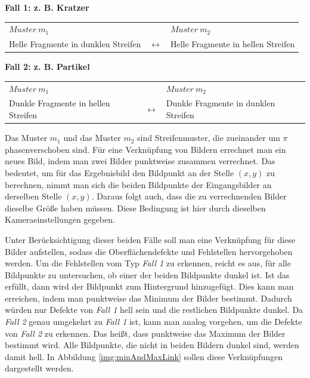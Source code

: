 \p
\textbf{Fall 1: z. B. Kratzer}
\nopagebreak
\par\medskip\noindent
\begin{tabular}{@{} p{} c p{} @{}}
$Muster ~m_1$ &  & $Muster ~m_2$ \\ 
	Helle Fragmente in dunklen Streifen & $ \longleftrightarrow $ & Helle Fragmente in hellen Streifen \\ 
\end{tabular}

\p
\textbf{Fall 2: z. B. Partikel}
\nopagebreak
\par\medskip\noindent
\begin{tabular}{@{} p{} c p{} @{}}
	$Muster ~m_1$ &  & $Muster ~m_2$ \\ 
	Dunkle Fragmente in hellen Streifen & $ \longleftrightarrow $ & Dunkle Fragmente in dunklen Streifen \\ 
\end{tabular}

\p
Das Muster $m_1$ und das Muster $m_2$ sind Streifenmuster, die zueinander um $ \pi $ phasenverschoben sind.
Für eine Verknüpfung von Bildern errechnet man ein neues Bild, indem man zwei Bilder punktweise zusammen verrechnet.
Das bedeutet, um für das Ergebnisbild den Bildpunkt an der Stelle $ (x,y) $ zu berechnen, nimmt man sich die beiden Bildpunkte der Eingangsbilder an derselben Stelle $ (x,y) $.
Daraus folgt auch, dass die zu verrechnenden Bilder dieselbe Größe haben müssen.
Diese Bedingung ist hier durch dieselben Kameraeinstellungen gegeben.


\p
Unter Berücksichtigung dieser beiden Fälle soll man eine Verknüpfung für diese Bilder aufstellen, sodass die Oberflächendefekte und Fehlstellen hervorgehoben werden.
Um die Fehlstellen vom Typ \textit{Fall 1} zu erkennen, reicht es aus, für alle Bildpunkte zu untersuchen, ob einer der beiden Bildpunkte dunkel ist.
Ist das erfüllt, dann wird der Bildpunkt zum Hintergrund hinzugefügt.
Dies kann man erreichen, indem man punktweise das Minimum der Bilder bestimmt.
Dadurch würden nur Defekte von \textit{Fall 1} hell sein und die restlichen Bildpunkte dunkel.
Da \textit{Fall 2} genau umgekehrt zu \textit{Fall 1} ist, kann man analog vorgehen, um die Defekte von \textit{Fall 2} zu erkennen.
Das heißt, dass punktweise das Maximum der Bilder bestimmt wird.
Alle Bildpunkte, die nicht in beiden Bildern dunkel sind, werden damit hell.
In Abbildung \ref{img:minAndMaxLink} sollen diese Verknüpfungen dargestellt werden.


